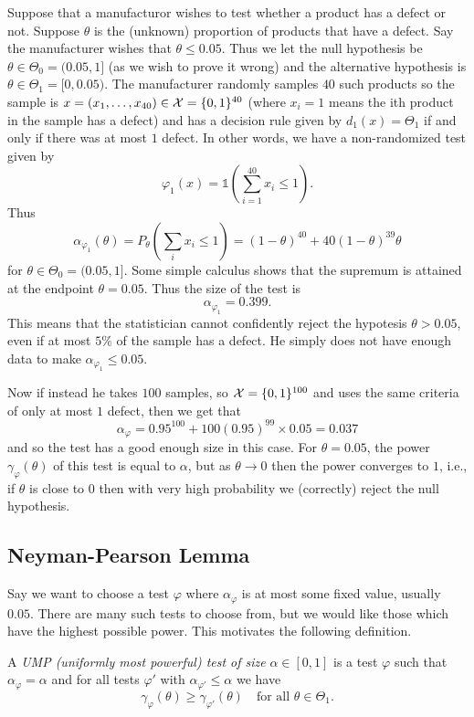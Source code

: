 \documentclass[twoside, a4paper, 10pt]{amsart}
\begin{document}
\begin{eg} Suppose that a manufacturor wishes to test whether a product has a defect or not. Suppose $\theta$ is the (unknown) proportion of products that have a defect. Say the manufacturer wishes that $\theta \leq 0.05$. Thus we let the null hypothesis be $\theta \in \Theta_0 = (0.05, 1]$ (as we wish to prove it wrong) and the alternative hypothesis is $\theta \in \Theta_1 = [0,0.05)$. The manufacturer randomly samples $40$ such products so the sample is $x =(x_1, \ldots, x_{40})\in \mathcal{X} = \{0,1\}^{40}$ (where $x_i = 1$ means the ith product in the sample has a defect) and has a decision rule given by $d_1(x) = \Theta_1$ if and only if there was at most $1$ defect. In other words, we have a non-randomized test given by $$\varphi_1(x) = \mathds{1}(\sum_{i=1}^{40} x_i \leq 1).$$
Thus $$\alpha_{\varphi_1}(\theta) =  P_{\theta}(\sum_{i} x_i \leq 1) = (1-\theta)^{40} + 40(1-\theta)^{39}\theta$$
for $\theta \in \Theta_0 = (0.05, 1].$ Some simple calculus shows that the supremum is attained at the endpoint $\theta = 0.05$. Thus the size of the test is $$\alpha_{\varphi_1} = 0.399.$$ This means that the statistician cannot confidently reject the hypotesis $\theta > 0.05$, even if at most $5 \%$ of the sample has a defect. He simply does not have enough data to make $\alpha_{\varphi_1} \leq 0.05$.

Now if instead he takes $100$ samples, so $\mathcal{X} = \{0,1\}^{100}$ and uses the same criteria of only at most $1$ defect, then we get that $$\alpha_{\varphi} = 0.95^{100} + 100(0.95)^{99}\times 0.05 = 0.037$$ and so the test has a good enough size in this case. For $\theta = 0.05$, the power $\gamma_{\varphi}(\theta)$ of this test is equal to $\alpha$, but as $\theta \to 0$ then the power converges to $1$, i.e., if $\theta$ is close to $0$ then with very high probability we (correctly) reject the null hypothesis.
\end{eg}

\subsection{Neyman-Pearson Lemma}

Say we want to choose a test $\varphi$ where $\alpha_{\varphi}$ is at most some fixed value, usually $0.05$. There are many such tests to choose from, but we would like those which have the highest possible power. This motivates the following definition.

\begin{mydef} A \textit{UMP (uniformly most powerful) test of size} $\alpha \in [0,1]$ is a test $\varphi$ such that $\alpha_{\varphi} = \alpha$ and for all tests $\varphi'$ with $\alpha_{\varphi'} \leq \alpha$ we have $$\gamma_{\varphi}(\theta) \geq \gamma_{\varphi'}(\theta) \quad\text{for all } \theta \in \Theta_1.$$
\end{mydef}
\end{document}

